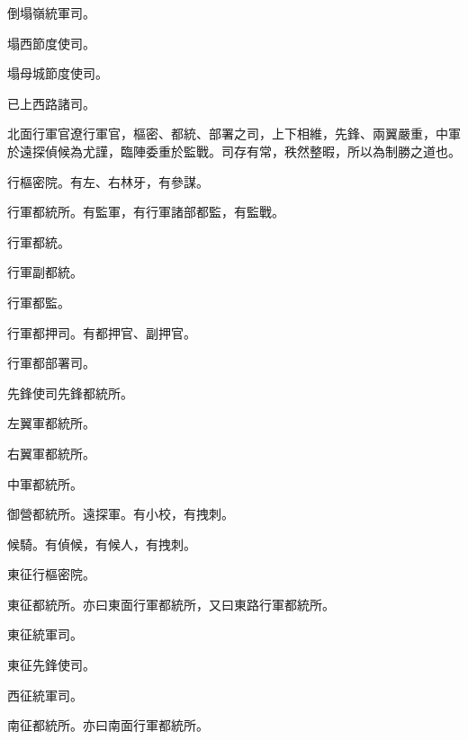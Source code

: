 \begin{pinyinscope}
 倒塌嶺統軍司。



 塌西節度使司。



 塌母城節度使司。



 已上西路諸司。



 北面行軍官遼行軍官，樞密、都統、部署之司，上下相維，先鋒、兩翼嚴重，中軍於遠探偵候為尤謹，臨陣委重於監戰。司存有常，秩然整暇，所以為制勝之道也。



 行樞密院。有左、右林牙，有參謀。



 行軍都統所。有監軍，有行軍諸部都監，有監戰。



 行軍都統。



 行軍副都統。



 行軍都監。



 行軍都押司。有都押官、副押官。



 行軍都部署司。



 先鋒使司先鋒都統所。



 左翼軍都統所。



 右翼軍都統所。



 中軍都統所。



 御營都統所。遠探軍。有小校，有拽刺。



 候騎。有偵候，有候人，有拽刺。



 東征行樞密院。



 東征都統所。亦曰東面行軍都統所，又曰東路行軍都統所。



 東征統軍司。



 東征先鋒使司。



 西征統軍司。



 南征都統所。亦曰南面行軍都統所。




\end{pinyinscope}
